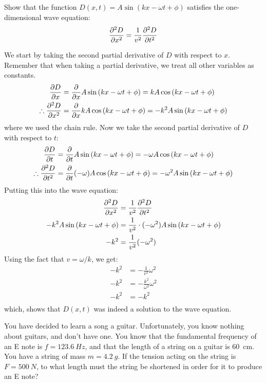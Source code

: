 \begin{solution}
\begin{parts}
\end{parts}
\end{solution}

\question Show that the function $D(x,t) = A\sin\left( kx -\omega t + \phi \right)$ satisfies the one-dimensional wave equation:
\begin{align*}
\frac{\partial ^2D}{\partial x^2}=\frac{1}{v^2}\frac{\partial ^2D}{\partial t^2}
\end{align*}
\begin{solution}
We start by taking the second partial derivative of $D$ with respect to $x$. Remember that when taking a partial derivative, we treat all other variables as constants. 
\begin{align*}
\frac{\partial D}{\partial x}&=\frac{\partial }{\partial x}A\sin\left( kx -\omega t + \phi \right)=kA\cos\left( kx -\omega t + \phi \right)\\
\therefore \frac{\partial ^2D}{\partial x^2}&=\frac{\partial }{\partial x}kA\cos\left( kx -\omega t + \phi \right)=-k^2A\sin\left( kx -\omega t + \phi \right)
\end{align*}
where we used the chain rule. Now we take the second partial derivative of $D$ with respect to $t$:
\begin{align*}
\frac{\partial D}{\partial t}&=\frac{\partial }{\partial t}A\sin\left( kx -\omega t + \phi \right)=-\omega A\cos\left( kx -\omega t + \phi \right)\\
\therefore \frac{\partial ^2D}{\partial t^2}&=\frac{\partial }{\partial t}(-\omega)A\cos\left( kx -\omega t + \phi \right)=-\omega^2A\sin\left( kx -\omega t + \phi \right)
\end{align*}
Putting this into the wave equation:
\begin{align*}
\frac{\partial ^2D}{\partial x^2}&=\frac{1}{v^2}\frac{\partial ^2D}{\partial t^2}\\
-k^2A\sin\left( kx -\omega t + \phi \right)&=\frac{1}{v^2}\cdot (-\omega^2)A\sin\left( kx -\omega t + \phi \right)\\
-k^2&=\frac{1}{v^2}(-\omega^2)\\
\end{align*}
Using the fact that $v=\omega/k$, we get:
\begin{align*}
-k^2&=-\frac{1}{v^2}\omega^2\\
-k^2&=-\frac{k^2}{\omega^2}\omega^2\\
-k^2&=-k^2\\
\end{align*}
which, shows that $D(x,t)$ was indeed a solution to the wave equation.
\end{solution}

\question You have decided to learn a song a guitar. Unfortunately, you know nothing about guitars, and don't have one. You know that the fundamental frequency of an E note is $f = \SI{123.6}{Hz}$, and that the length of a string on a guitar is \SI{60}{cm}. You have a string of mass $m = \SI{4.2}{g}$. If the tension acting on the string is $F = \SI{500}{N}$, to what length must the string be shortened in order for it to produce an E note?

